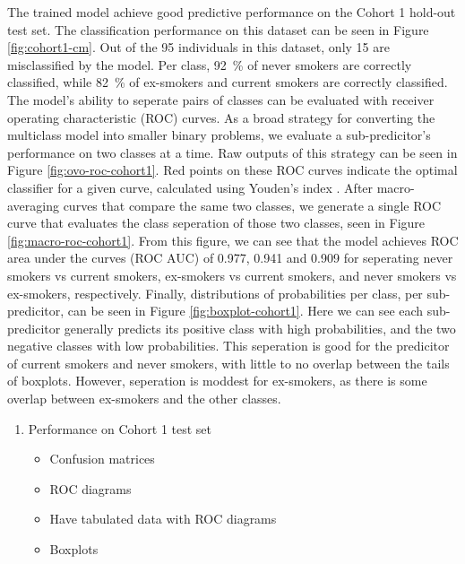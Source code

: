 \documentclass{article}
\begin{document}
The trained model achieve good predictive performance on the Cohort 1 hold-out test set. The classification performance on this dataset can be seen in Figure \ref{fig:cohort1-cm}. Out of the 95 individuals in this dataset, only 15 are misclassified by the model. Per class, \SI{92}{\percent} of never smokers are correctly classified, while \SI{82}{\percent} of ex-smokers and current smokers are correctly classified. The model's ability to seperate pairs of classes can be evaluated with receiver operating characteristic (ROC) curves. As a broad strategy for converting the multiclass model into smaller binary problems, we evaluate a sub-predicitor's performance on two classes at a time. Raw outputs of this strategy can be seen in Figure \ref{fig:ovo-roc-cohort1}. Red points on these ROC curves indicate the optimal classifier for a given curve, calculated using Youden's index \cite{youden1950index}. After macro-averaging \cite{scikit-learn-roc-example} curves that compare the same two classes, we generate a single ROC curve that evaluates the class seperation of those two classes, seen in Figure \ref{fig:macro-roc-cohort1}. From this figure, we can see that the model achieves ROC area under the curves (ROC AUC) of 0.977, 0.941 and 0.909 for seperating never smokers vs current smokers, ex-smokers vs current smokers, and never smokers vs ex-smokers, respectively. Finally, distributions of probabilities per class, per sub-predicitor, can be seen in Figure \ref{fig:boxplot-cohort1}. Here we can see each sub-predicitor generally predicts its positive class with high probabilities, and the two negative classes with low probabilities. This seperation is good for the predicitor of current smokers and never smokers, with little to no overlap between the tails of boxplots. However, seperation is moddest for ex-smokers, as there is some overlap between ex-smokers and the other classes. 

\begin{enumerate}
    \item Performance on Cohort 1 test set
          \begin{itemize}
              \item Confusion matrices
              \item ROC diagrams
              \item Have tabulated data with ROC diagrams
              \item Boxplots
          \end{itemize}
\end{enumerate}
\end{document}
